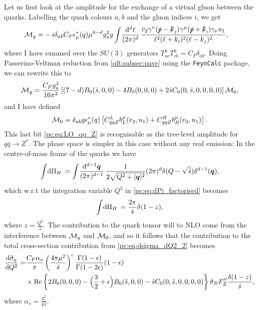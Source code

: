 \documentclass[../main.tex]{subfiles}
\begin{document}
Let us first look at the amplitude for the exchange of a virtual gluon between the quarks.
Labelling the quark colours \(a, b\) and the gluon indices \(i\), we get
\begin{align}
  \M_g = & -i\delta_{ab} C_F \epsilon_\mu^\ast(q) \mu^{4-d} g_s^2 g \loopintegral[d]{\ell} \frac{\bar{v}_2 \gamma^\nu (\slashed{p}-\slashed{k}_j) \gamma^\mu (\slashed{p}+\slashed{k}_i) \gamma_\nu u_1}{\ell^2(\ell+k_i)^2(\ell-k_j)^2},
\end{align}
where I have summed over the \(SU(3)\) generators \(T_{ac}^k T_{cb}^k = C_F \delta_{ab}\).
Doing Passerino-Veltman reduction from \cref{qft:subsec:pave} using the \verb|FeynCalc| package, we can rewrite this to
\begin{equation}
  \M_g = \frac{C_F g_s^2}{16\pi^2} \bclosed{(7-d)B_0(\hat{s},0,0) - 4B_0(0,0,0) + 2\hat{s}C_0(0,\hat{s},0,0,0,0)} \M_0,
\end{equation}
and I have defined
\begin{equation}
  \label{pc:eq:LO_qq_Z}
  \M_0 = \delta_{ab} g \epsilon_\mu^\ast(q) \bclosed{C_{qqZ}^L b_L^\mu(v_2, u_1) + C_{qqZ}^R b_R^\mu(v_2, u_1)}.
\end{equation}
This last bit \cref{pc:eq:LO_qq_Z} is recognisable as the tree-level amplitude for \(q\bar{q} \to Z^\ast\).
The phase space is simpler in this case without any real emission: In the centre-of-mass frame of the quarks we have
\begin{equation}
  \integral{\Pi_H} = \loopintegral[d-1]{\vec{q}} \frac{1}{2\sqrt{Q^2+|\vec{q}|^2}} (2\pi)^d \delta(Q - \sqrt{\hat{s}}) \delta^{d-1}(\vec{q}),
\end{equation}
which w.r.t the integration variable \(Q^2\) in \cref{pc:eq:dPi_factorised} becomes
\begin{equation}
  \integral{\Pi_H} = \frac{2\pi}{\hat{s}} \delta(1-z),
\end{equation}
where \(z = \frac{Q^2}{\hat{s}}\).
The contribution to the quark tensor will to NLO come from the interference between \(\M_g\) and \(\M_0\), and so it follows that the contribution to the total cross-section contribution from \cref{pc:eq:dsigma_dQ2_2} becomes
\begin{align}
  \nonumber
  \d[Q^2]{\hat\sigma_g} = & \frac{C_F \alpha_s}{\pi} \pclosed{\frac{4\pi \mu^2}{\hat{s}}}^\epsilon \frac{\Gamma(1-\epsilon)}{\Gamma(1-2\epsilon)} (1-\epsilon)                                       \\
                          & \times \Re{2B_0(0,0,0) - \Bigl(\frac{3}{2}+\epsilon\Bigr)B_0(\hat{s},0,0) - \hat{s} C_0(0,\hat{s},0,0,0,0)} \hat\sigma_B F^{\prime\prime}_Z \frac{\delta(1-z)}{\hat{s}},
\end{align}
where \(\alpha_s = \frac{g_s^2}{4\pi}\).
\end{document}

